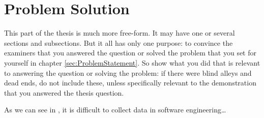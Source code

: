 \chapter{Problem Solution}
\label{sec:ProblemSolution}

This part of the thesis is much more free-form. It may have one or several
sections and subsections. But it all has only one purpose: to convince the
examiners that you answered the question or solved the problem that you set for
yourself in chapter \ref{sec:ProblemStatement}. So show what you did that is
relevant to answering the question or solving the problem: if there were blind
alleys and dead ends, do not include these, unless specifically relevant to the
demonstration that you answered the thesis question.

As we can see in \cite{Maps2014}, it is difficult to collect data in software engineering\ldots